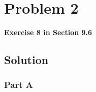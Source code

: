
\begingroup
\allowdisplaybreaks

\newpage
\section{Problem 2}

\textbf{Exercise 8 in Section 9.6}

\subsection{Solution}

\subsubsection{Part A}

